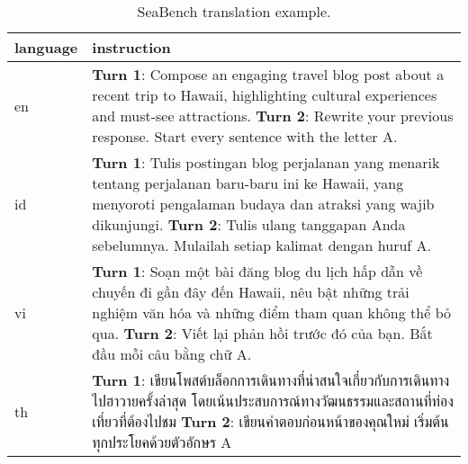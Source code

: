 \begin{table*}[ht]
    \centering
    \begin{tabular}{p{}p{}}
    \toprule
        language &  instruction \\
        \midrule
        en & \textbf{Turn 1}: Compose an engaging travel blog post about a recent trip to Hawaii, highlighting cultural experiences and must-see attractions. \newline
        \textbf{Turn 2}: Rewrite your previous response. Start every sentence with the letter A. \\

        \midrule
        id & \textbf{Turn 1}: Tulis postingan blog perjalanan yang menarik tentang perjalanan baru-baru ini ke Hawaii, yang menyoroti pengalaman budaya dan atraksi yang wajib dikunjungi. \newline 
        \textbf{Turn 2}: Tulis ulang tanggapan Anda sebelumnya. Mulailah setiap kalimat dengan huruf A.\\
        \midrule 
        vi & \textbf{Turn 1}: Soạn một bài đăng blog du lịch hấp dẫn về chuyến đi gần đây đến Hawaii, nêu bật những trải nghiệm văn hóa và những điểm tham quan không thể bỏ qua.\newline 
        \textbf{Turn 2}: Viết lại phản hồi trước đó của bạn. Bắt đầu mỗi câu bằng chữ A.\\
        \midrule
        th & \textbf{Turn 1}: เขียนโพสต์บล็อกการเดินทางที่น่าสนใจเกี่ยวกับการเดินทางไปฮาวายครั้งล่าสุด โดยเน้นประสบการณ์ทางวัฒนธรรมและสถานที่ท่องเที่ยวที่ต้องไปชม\newline 
        \textbf{Turn 2}: เขียนคำตอบก่อนหน้าของคุณใหม่ เริ่มต้นทุกประโยคด้วยตัวอักษร A\\
    \bottomrule
    \end{tabular}
    \caption{SeaBench translation example.}
    \label{tab:mt-bench_example}
\end{table*}